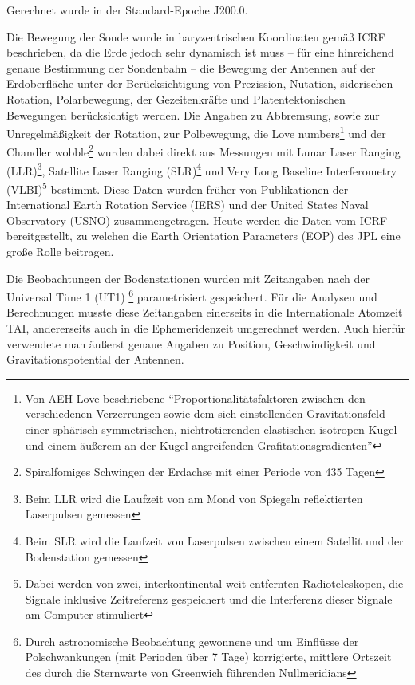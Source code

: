 Gerechnet wurde in der Standard-Epoche J200.0. %

Die Bewegung der Sonde wurde in baryzentrischen Koordinaten gemäß ICRF beschrieben, %
da die Erde jedoch sehr dynamisch ist muss – für eine hinreichend genaue Bestimmung der Sondenbahn –
die Bewegung der Antennen auf der Erdoberfläche unter der Berücksichtigung von Prezission, Nutation,
siderischen Rotation, Polarbewegung, der Gezeitenkräfte und Platentektonischen Bewegungen berücksichtigt werden.
Die Angaben zu Abbremsung, sowie zur Unregelmäßigkeit der Rotation, zur Polbewegung, die Love numbers\footnote{Von AEH Love beschriebene ``Proportionalitätsfaktoren zwischen den verschiedenen Verzerrungen sowie dem sich einstellenden Gravitationsfeld einer sphärisch symmetrischen, nichtrotierenden elastischen isotropen Kugel und einem äußerem an der Kugel angreifenden Grafitationsgradienten''\cite{Dittus2006}} und der Chandler wobble\footnote{Spiralfomiges Schwingen
der Erdachse mit einer Periode von 435 Tagen} %
wurden dabei direkt aus Messungen mit Lunar Laser Ranging (LLR)\footnote{Beim LLR wird die Laufzeit von am Mond von Spiegeln reflektierten Laserpulsen gemessen},
Satellite Laser Ranging (SLR)\footnote{Beim SLR wird die Laufzeit von Laserpulsen zwischen einem Satellit und der Bodenstation gemessen} und Very Long Baseline Interferometry
(VLBI)\footnote{Dabei werden von zwei, interkontinental weit entfernten Radioteleskopen, die Signale inklusive
Zeitreferenz gespeichert und die Interferenz dieser Signale am Computer stimuliert} bestimmt.
Diese Daten wurden früher von Publikationen der International Earth Rotation Service (IERS) und der United States Naval Observatory (USNO) zusammengetragen. Heute werden die Daten vom ICRF bereitgestellt, zu welchen die Earth Orientation Parameters
(EOP) des JPL eine große Rolle beitragen.\cite{Anderson2002}

Die Beobachtungen der Bodenstationen wurden mit Zeitangaben nach der Universal Time 1 (UT1)
\footnote{Durch astronomische Beobachtung gewonnene und um Einflüsse der Polschwankungen (mit Perioden über 7 Tage) korrigierte, mittlere Ortszeit des durch die Sternwarte von Greenwich führenden Nullmeridians}
parametrisiert gespeichert. Für die Analysen und
Berechnungen musste diese Zeitangaben einerseits in die Internationale Atomzeit TAI, andererseits auch in die
Ephemeridenzeit umgerechnet werden. Auch hierfür verwendete man äußerst genaue Angaben zu Position, Geschwindigkeit und
Gravitationspotential der Antennen.\cite{Dittus2006}

